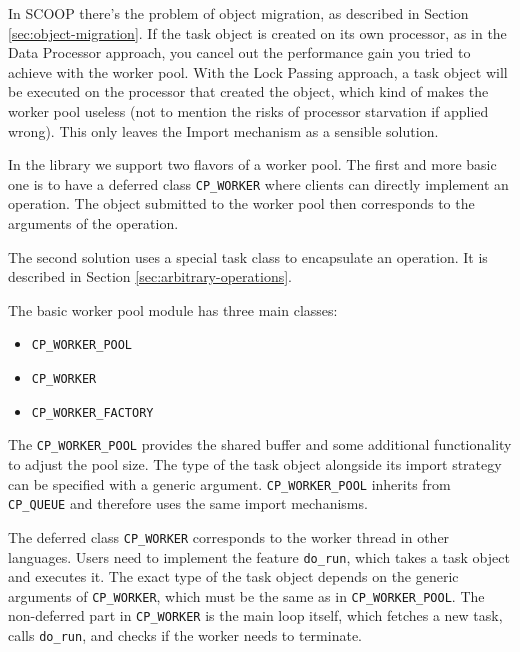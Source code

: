 In SCOOP there's the problem of object migration, as described in Section \ref{sec:object-migration}.
If the task object is created on its own processor, as in the Data Processor approach, you cancel out the performance gain you tried to achieve with the worker pool.
With the Lock Passing approach, a task object will be executed on the processor that created the object, which kind of makes the worker pool useless (not to mention the risks of processor starvation if applied wrong).
This only leaves the Import mechanism as a sensible solution.

In the library we support two flavors of a worker pool.
The first and more basic one is to have a deferred class \lstinline!CP_WORKER! where clients can directly implement an operation.
The object submitted to the worker pool then corresponds to the arguments of the operation.

The second solution uses a special task class to encapsulate an operation.
It is described in Section \ref{sec:arbitrary-operations}.


The basic worker pool module has three main classes:
\begin{itemize}
 \item \lstinline!CP_WORKER_POOL!
 \item \lstinline!CP_WORKER!
 \item \lstinline!CP_WORKER_FACTORY!
\end{itemize}

The \lstinline!CP_WORKER_POOL! provides the shared buffer and some additional functionality to adjust the pool size.
The type of the task object alongside its import strategy can be specified with a generic argument.
\lstinline!CP_WORKER_POOL! inherits from \lstinline!CP_QUEUE! and therefore uses the same import mechanisms.

The deferred class \lstinline!CP_WORKER! corresponds to the worker thread in other languages.
Users need to implement the feature \lstinline!do_run!, which takes a task object and executes it.
The exact type of the task object depends on the generic arguments of \lstinline!CP_WORKER!, which must be the same as in \lstinline!CP_WORKER_POOL!.
The non-deferred part in \lstinline!CP_WORKER! is the main loop itself, which fetches a new task, calls \lstinline!do_run!, and checks if the worker needs to terminate.


